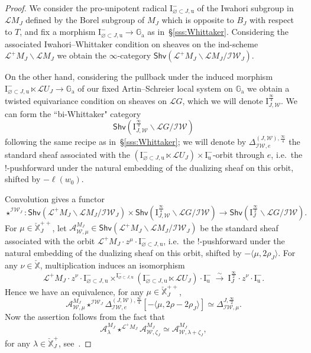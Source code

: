\documentclass[11pt]{amsart}
\numberwithin{equation}{section}
\theoremstyle{plain}
\theoremstyle{definition}
\newcommand{\sA}{{\mathcal A}}
\newcommand{\I}{{\mathrm I}}
\newcommand{\sL}{{\mathcal L}}
\newcommand{\sW}{{\mathcal W}}
\newcommand{\X}{{\mathbb X}}
\newcommand{\Xd}{\check{\X}}
\newcommand{\xs}{{\ \xrightarrow{\sim}\ }}
\newcommand{\Ga}{{\mathbb{G}_{\mathrm{a}}}}
\newcommand{\semi}{{{\frac{\infty}{2}}}}
\newcommand{\quar}{{{\frac{\infty}{4}}}}
\newcommand{\IW}{\mathcal{IW}}
\newcommand{\Shv}{\mathsf{Shv}}
\newcommand{\Iu}{\mathrm{I}_{\mathrm{u}}}
\begin{document}
\begin{proof}
We consider 
the pro-unipotent radical $\I^-_{\varnothing\subset J,\mathrm{u}}$ of the Iwahori subgroup in $\sL{M_J}$ defined by the Borel subgroup of $M_J$ which is opposite to $B_J$ with respect to $T$, and fix a morphism $\I^-_{\varnothing\subset J,\mathrm{u}} \to \Ga$ as in~\S\ref{sss:Whittaker}. Considering the associated Iwahori--Whittaker condition on sheaves on the ind-scheme $\sL^+ M_J \backslash \sL M_J$ we obtain the $\infty$-category $\Shv(\sL^+M_J\backslash \sL{M_J}/\IW_J)$.

On the other hand, considering the pullback under the induced morphism $\I^-_{\varnothing\subset J,\mathrm{u}}\ltimes \sL{U_J} \to \Ga$ of our fixed Artin--Schreier local system on $\Ga$ we obtain a twisted equivariance condition on sheaves on $\sL G$, which we will denote
$\I^\quar_{J,\sW}$. 
We can form the ``bi-Whittaker" category 
\[
\Shv \left( \I^\quar_{J,\sW}\backslash \sL{G}/\IW \right)
\]
following the same recipe as in~\S\ref{sss:Whittaker}; we will
denote by $\Delta^{(J,\sW),\quar}_{\IW,e}$ the standard sheaf
associated with the $(\I^-_{\varnothing\subset J,\mathrm{u}}\ltimes \sL{U_J})\times \Iu^-$-orbit through $e$, i.e.~the $!$-pushforward under the natural embedding of the dualizing sheaf on this orbit, shifted by $-\ell(w_0)$.

Convolution gives a functor
\[
\star^{\IW_J}: \Shv \left( \sL^+M_J\backslash \sL{M_J}/\IW_J \right) \times \Shv \left( \I^\quar_{J,\sW}\backslash \sL{G}/\IW \right) \rightarrow \Shv \left( \I^\semi_{J}\backslash \sL{G}/\IW \right). 
\] 
For $\mu\in \Xd_J^{++}$, let $\sA^{M_J}_{\sW,\mu}\in \Shv(\sL^+M_J\backslash \sL{M_J}/\IW_J)$ be the standard sheaf associated with the orbit $\sL^+M_J\cdot z^\mu\cdot \I^-_{\varnothing\subset J,\mathrm{u}}$, i.e.~the $!$-pushforward under the natural embedding of the dualizing sheaf on this orbit, shifted by $-\langle \mu, 2\rho_J \rangle$. 
For any $\nu\in \Xd$, multiplication induces an isomorphism 
\[
\sL^+M_J\cdot z^{\nu}\cdot \I^-_{\varnothing\subset J,\mathrm{u}} \times^{\I^-_{\varnothing\subset J,\mathrm{u}}} (\I^-_{\varnothing\subset J,\mathrm{u}}\ltimes \sL{U_J})\cdot \Iu^- \xs 
\I^\semi_J\cdot z^{\nu}\cdot \Iu^-.
\]
Hence we have an equivalence, for any $\mu\in \Xd_J^{++}$, 
\[
\sA^{M_J}_{\sW,\mu}\star^{\IW_J} \Delta^{(J,\sW),\quar}_{\IW,e} [-\langle \mu, 2\rho-2\rho_J \rangle]
\simeq \Delta^{J,\semi}_{\IW,\mu}. 
\]
Now the assertion follows from the fact that
\[
\sA_{\lambda}^{M_J}\star^{\sL^+M_J} \sA_{\sW,\zeta_J}^{M_J}\simeq \sA_{\sW,\lambda+\zeta_J}^{M_J},
\]
for any $\lambda \in \Xd_J^{+}$,
see~\cite[Proof of Theorem 3.9]{BGMRR}.
\end{proof}
\end{document}
